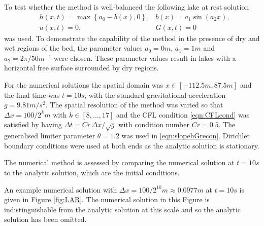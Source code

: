 \documentclass[times]{elsarticle}
\begin{document}
To test whether the method is well-balanced the following lake at rest solution
	\begin{align*}
	&h(x,t) = \max\left\lbrace a_0 - b(x), 0 \right\rbrace, & b(x) = a_1 \sin\left(a_2 x\right), \\
	&u(x,t) = 0 , 	&G(x,t) = 0
	\end{align*}
was used. To demonstrate the capability of the method in the presence of dry and wet regions of the bed, the parameter values $a_0 = 0m$, $a_1 = 1m$ and $a_2 = 2 \pi / 50 m^{-1} $ were chosen. These parameter values result in lakes with a horizontal free surface surrounded by dry regions.

For the numerical solutions the spatial domain was $x \in \left[-112.5 m,87.5 m\right]$ and the final time was $t=10s$, with the standard gravitational acceleration $g= 9.81 m/s^2$. The spatial resolution of the method was varied so that $\Delta x = 100 / 2^k m$ with $k \in \left[8, \dots ,17\right]$ and the CFL condition \eqref{eqn:CFLcond} was satisfied by having $\Delta t = Cr\, \Delta x / \sqrt{g}$ with condition number $Cr = 0.5$. The generalised limiter parameter $\theta = 1.2$ was used in \eqref{eqn:slopehGrecon}. Dirichlet boundary conditions were used at both ends as the analytic solution is stationary.

The numerical method is assessed by comparing the numerical solution at $t=10s$ to the analytic solution, which are the initial conditions.

An example numerical solution with $\Delta x = 100/2^{10}m \approx 0.0977m$ at $t=10s$ is given in Figure \ref{fig:LAR}. The numerical solution in this Figure is indistinguishable from the analytic solution at this scale and so the analytic solution has been omitted. 
\end{document}
